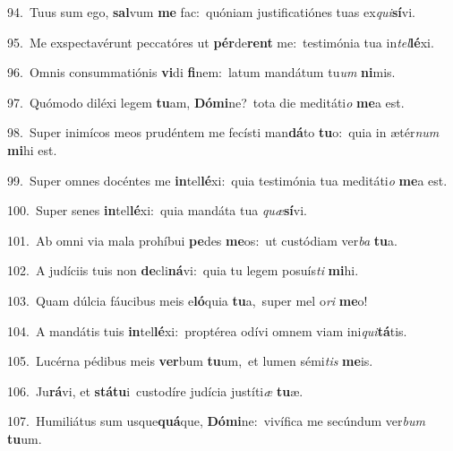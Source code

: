 {\numbfont\textcolor{\numbcolor}{94.}}~Tuus sum ego, \textbf{sal}\-vum \textbf{me} fac:~\star quóniam justificatiónes tuas ex\-\textit{qui}\-\textbf{sí}vi.\par
{\numbfont\textcolor{\numbcolor}{95.}}~Me exspectavérunt peccatóres ut \textbf{pér}\-de\textbf{rent} me:~\star testimónia tua in\-\textit{tel}\-\textbf{lé}xi.\par
{\numbfont\textcolor{\numbcolor}{96.}}~Omnis consummatiónis \textbf{vi}\-di \textbf{fi}\-nem:~\star latum mandátum tu\textit{um} \textbf{ni}\-mis.\par
{\numbfont\textcolor{\numbcolor}{97.}}~Quómodo diléxi legem \textbf{tu}\-am, \textbf{Dó}\-\textbf{mi}ne?~\star tota die meditáti\textit{o} \textbf{me}\-a est.\par
{\numbfont\textcolor{\numbcolor}{98.}}~Super inimícos meos prudéntem me fecísti man\-\textbf{dá}\-to \textbf{tu}\-o:~\star quia in ætér\textit{num} \textbf{mi}\-hi est.\par
{\numbfont\textcolor{\numbcolor}{99.}}~Super omnes docéntes me \textbf{in}\-tel\-\textbf{lé}\-xi:~\star quia testimónia tua meditáti\textit{o} \textbf{me}\-a est.\par
{\numbfont\textcolor{\numbcolor}{100.}}~Super senes \textbf{in}\-tel\-\textbf{lé}\-xi:~\star quia mandáta tua \textit{quæ}\-\textbf{sí}vi.\par
{\numbfont\textcolor{\numbcolor}{101.}}~Ab omni via mala prohíbui \textbf{pe}\-des \textbf{me}\-os:~\star ut custódiam ver\textit{ba} \textbf{tu}\-a.\par
{\numbfont\textcolor{\numbcolor}{102.}}~A judíciis tuis non \textbf{de}\-cli\-\textbf{ná}\-vi:~\star quia tu legem posuís\textit{ti} \textbf{mi}\-hi.\par
{\numbfont\textcolor{\numbcolor}{103.}}~Quam dúlcia fáucibus meis e\-\textbf{ló}\-quia \textbf{tu}\-a,~\star super mel o\textit{ri} \textbf{me}\-o!\par
{\numbfont\textcolor{\numbcolor}{104.}}~A mandátis tuis \textbf{in}\-tel\-\textbf{lé}\-xi:~\star proptérea odívi omnem viam ini\-\textit{qui}\-\textbf{tá}tis.\par
{\numbfont\textcolor{\numbcolor}{105.}}~Lucérna pédibus meis \textbf{ver}\-bum \textbf{tu}\-um,~\star et lumen sémi\textit{tis} \textbf{me}\-is.\par
{\numbfont\textcolor{\numbcolor}{106.}}~Ju\-\textbf{rá}\-vi, et \textbf{stá}\-\textbf{tu}i~\star custodíre judícia justíti\textit{æ} \textbf{tu}\-æ.\par
{\numbfont\textcolor{\numbcolor}{107.}}~Humiliátus sum usque\-\textbf{quá}\-que, \textbf{Dó}\-\textbf{mi}ne:~\star vivífica me secúndum ver\textit{bum} \textbf{tu}\-um.\par
